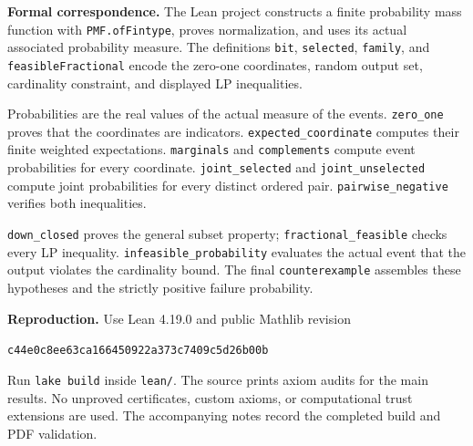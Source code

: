 \documentclass[11pt]{article}
\begin{document}
\textbf{Formal correspondence.}
The Lean project constructs a finite probability mass function with
\texttt{PMF.ofFintype}, proves normalization, and uses its actual
associated probability measure. The definitions \texttt{bit},
\texttt{selected}, \texttt{family}, and \texttt{feasibleFractional}
encode the zero-one coordinates, random output set, cardinality
constraint, and displayed LP inequalities.

Probabilities are the real values of the actual measure of the events.
\texttt{zero\_one} proves that the coordinates are indicators.
\texttt{expected\_coordinate} computes their finite weighted expectations.
\texttt{marginals} and \texttt{complements} compute event probabilities
for every coordinate. \texttt{joint\_selected} and
\texttt{joint\_unselected} compute joint probabilities for every distinct
ordered pair. \texttt{pairwise\_negative} verifies both inequalities.

\texttt{down\_closed} proves the general subset property;
\texttt{fractional\_feasible} checks every LP inequality.
\texttt{infeasible\_probability} evaluates the actual event that the
output violates the cardinality bound. The final \texttt{counterexample}
assembles these hypotheses and the strictly positive failure probability.

\textbf{Reproduction.}
Use Lean 4.19.0 and public Mathlib revision
\begin{center}\small\texttt{c44e0c8ee63ca166450922a373c7409c5d26b00b}\end{center}
Run \texttt{lake build} inside \texttt{lean/}.
The source prints axiom audits for the main results. No unproved
certificates, custom axioms, or computational trust extensions are used.
The accompanying notes record the completed build and PDF validation.
\end{document}
